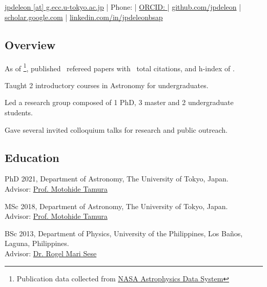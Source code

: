 \documentclass[12pt,letterpaper]{article}
\begin{document}
\thispagestyle{empty}\sloppy\sloppypar\raggedbottom

\textbf{\Large \fullname} \\[0.5ex]
\currentposition \\
\textsf{\small 
    \href{mailto:\email}{jpdeleon [at] g.ecc.u-tokyo.ac.jp} | %
    Phone: {\phonenumber} | %
    \href{\orcidurl}{ORCID: \orcid} | %
    \href{\githuburl}{github.com/jpdeleon} | %
    \href{\scholarurl}{scholar.google.com} | %
    \href{\linkedinurl}{linkedin.com/in/jpdeleonbsap}
}\\[0.5ex]

\subsection{Overview}
\begin{list}{}{\cvlist}
      \item As of \pubsdate\footnote{Publication data collected from \href{https://ui.adsabs.harvard.edu/}{NASA Astrophysics Data System}}, published \pubsnumber\ refereed papers with \pubscitations\ total citations, and h-index of \pubshindex.
      \item Taught 2 introductory courses in Astronomy for undergraduates. 
      \item Led a research group composed of 1 PhD, 3 master and 2 undergraduate students. 
      \item Gave several invited colloquium talks for research and public outreach.
\end{list}

\subsection{Education}
\begin{list}{}{\cvlist}
    \item
          PhD 2021, Department of Astronomy, The University of Tokyo, Japan.\\Advisor: \href{\tamuraurl}{Prof. Motohide Tamura}
    \item
          MSc 2018, Department of Astronomy, The University of Tokyo, Japan.\\Advisor: \href{\tamuraurl}{Prof. Motohide Tamura}
    \item
          BSc 2013, Department of Physics, University of the Philippines, Los Ba\~nos, Laguna, Philippines.\\Advisor: \href{\seseurl}{Dr. Rogel Mari Sese}      
\end{list}
\end{document}
